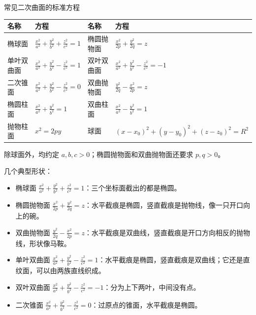 \begin{tablebox}{常见二次曲面的标准方程}
\centering
\small
\renewcommand{\arraystretch}{1.55}
\begin{tabular}{llll}
\toprule
名称 & 方程 & 名称 & 方程\\
\midrule
椭球面 & $\frac{x^2}{a^2}+\frac{y^2}{b^2}+\frac{z^2}{c^2}=1$
  & 椭圆抛物面 & $\frac{x^2}{2p}+\frac{y^2}{2q}=z$\\
单叶双曲面 & $\frac{x^2}{a^2}+\frac{y^2}{b^2}-\frac{z^2}{c^2}=1$
  & 双叶双曲面 & $\frac{x^2}{a^2}+\frac{y^2}{b^2}-\frac{z^2}{c^2}=-1$\\
二次锥面 & $\frac{x^2}{a^2}+\frac{y^2}{b^2}-\frac{z^2}{c^2}=0$
  & 双曲抛物面 & $\frac{y^2}{2q}-\frac{x^2}{2p}=z$\\
椭圆柱面 & $\frac{x^2}{a^2}+\frac{y^2}{b^2}=1$
  & 双曲柱面 & $\frac{x^2}{a^2}-\frac{y^2}{b^2}=1$\\
抛物柱面 & $x^2=2py$
  & 球面 & $(x-x_0)^2+(y-y_0)^2+(z-z_0)^2=R^2$\\
\bottomrule
\end{tabular}

\vspace{2pt}
{\footnotesize 除球面外，均约定 \(a,b,c>0\)；椭圆抛物面和双曲抛物面还要求 \(p,q>0\)。}
\end{tablebox}

几个典型形状：
\begin{itemize}
  \item 椭球面 \(\frac{x^2}{a^2}+\frac{y^2}{b^2}+\frac{z^2}{c^2}=1\)：三个坐标面截出的都是椭圆。
  \item 椭圆抛物面 \(\frac{x^2}{2p}+\frac{y^2}{2q}=z\)：水平截痕是椭圆，竖直截痕是抛物线，像一只开口向上的碗。
  \item 双曲抛物面 \(\frac{y^2}{2q}-\frac{x^2}{2p}=z\)：水平截痕是双曲线，竖直截痕是开口方向相反的抛物线，形状像马鞍。
  \item 单叶双曲面 \(\frac{x^2}{a^2}+\frac{y^2}{b^2}-\frac{z^2}{c^2}=1\)：水平截痕是椭圆，竖直截痕是双曲线；它还是直纹面，可以由两族直线织成。
  \item 双叶双曲面 \(\frac{x^2}{a^2}+\frac{y^2}{b^2}-\frac{z^2}{c^2}=-1\)：分为上下两叶，中间没有点。
  \item 二次锥面 \(\frac{x^2}{a^2}+\frac{y^2}{b^2}-\frac{z^2}{c^2}=0\)：过原点的锥面，水平截痕是椭圆。
\end{itemize}

